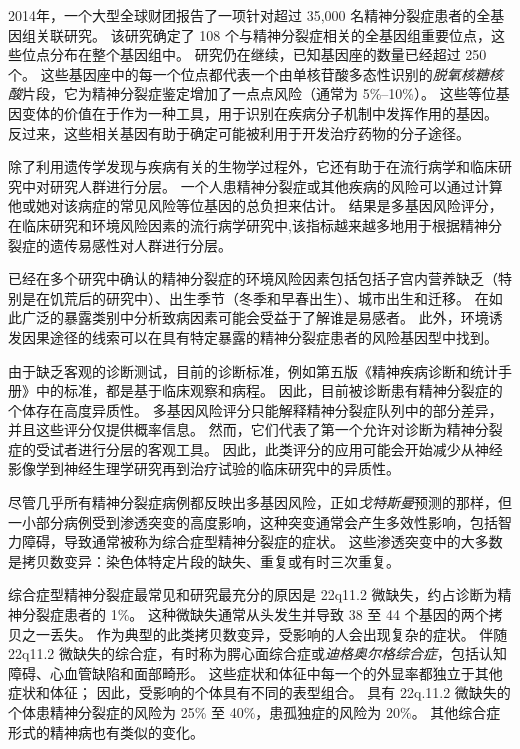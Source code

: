 2014年，一个大型全球财团报告了一项针对超过 35,000 名精神分裂症患者的全基因组关联研究。
该研究确定了 108 个与精神分裂症相关的全基因组重要位点，这些位点分布在整个基因组中。
研究仍在继续，已知基因座的数量已经超过 250 个。
这些基因座中的每一个位点都代表一个由单核苷酸多态性识别的\textit{脱氧核糖核酸}片段，它为精神分裂症鉴定增加了一点点风险（通常为 5\%–10\%）。
这些等位基因变体的价值在于作为一种工具，用于识别在疾病分子机制中发挥作用的基因。
反过来，这些相关基因有助于确定可能被利用于开发治疗药物的分子途径。


除了利用遗传学发现与疾病有关的生物学过程外，它还有助于在流行病学和临床研究中对研究人群进行分层。
一个人患精神分裂症或其他疾病的风险可以通过计算他或她对该病症的常见风险等位基因的总负担来估计。
结果是多基因风险评分，在临床研究和环境风险因素的流行病学研究中,该指标越来越多地用于根据精神分裂症的遗传易感性对人群进行分层。


已经在多个研究中确认的精神分裂症的环境风险因素包括包括子宫内营养缺乏（特别是在饥荒后的研究中）、出生季节（冬季和早春出生）、城市出生和迁移。
在如此广泛的暴露类别中分析致病因素可能会受益于了解谁是易感者。
此外，环境诱发因果途径的线索可以在具有特定暴露的精神分裂症患者的风险基因型中找到。


由于缺乏客观的诊断测试，目前的诊断标准，例如第五版《精神疾病诊断和统计手册》中的标准，都是基于临床观察和病程。
因此，目前被诊断患有精神分裂症的个体存在高度异质性。
多基因风险评分只能解释精神分裂症队列中的部分差异，并且这些评分仅提供概率信息。
然而，它们代表了第一个允许对诊断为精神分裂症的受试者进行分层的客观工具。
因此，此类评分的应用可能会开始减少从神经影像学到神经生理学研究再到治疗试验的临床研究中的异质性。


尽管几乎所有精神分裂症病例都反映出多基因风险，正如\textit{戈特斯曼}预测的那样，但一小部分病例受到渗透突变的高度影响，这种突变通常会产生多效性影响，包括智力障碍，导致通常被称为综合症型精神分裂症的症状。
这些渗透突变中的大多数是拷贝数变异：染色体特定片段的缺失、重复或有时三次重复。


综合症型精神分裂症最常见和研究最充分的原因是 22q11.2 微缺失，约占诊断为精神分裂症患者的 1\%。
这种微缺失通常从头发生并导致 38 至 44 个基因的两个拷贝之一丢失。
作为典型的此类拷贝数变异，受影响的人会出现复杂的症状。
伴随 22q11.2 微缺失的综合症，有时称为腭心面综合症或\textit{迪格奥尔格综合症}，包括认知障碍、心血管缺陷和面部畸形。
这些症状和体征中每一个的外显率都独立于其他症状和体征；
因此，受影响的个体具有不同的表型组合。
具有 22q.11.2 微缺失的个体患精神分裂症的风险为 25\% 至 40\%，患孤独症的风险为 20\%。
其他综合症形式的精神病也有类似的变化。


